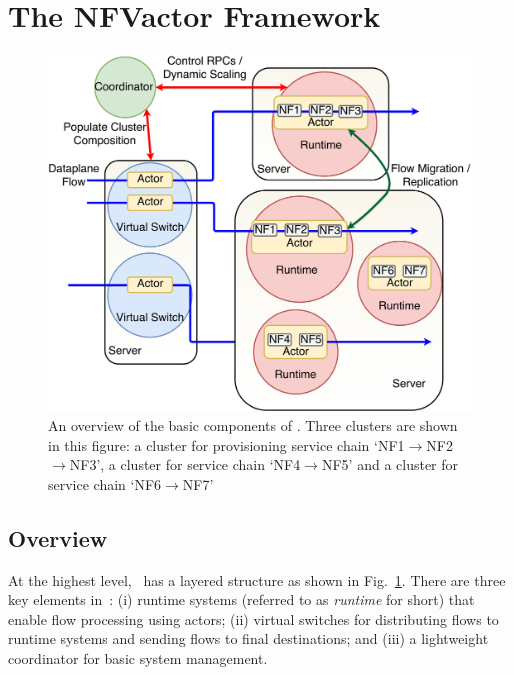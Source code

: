 
\section {The NFVactor Framework}
\label{sec:nfvactor-runtime-and-controller}

\begin{figure}[!t]
  \centering
  \includegraphics[width=\columnwidth]{chap-nfvactor/figure/new-nfactor-cluster.pdf}
  \caption{An overview of the basic components of \nfactor. Three clusters are shown in this figure: a cluster for provisioning service chain `NF1$\rightarrow$NF2$\rightarrow$NF3', a cluster for service chain `NF4$\rightarrow$NF5' and a cluster for service chain `NF6$\rightarrow$NF7'}
  \label{fig:runtime}
\end{figure}

\subsection{Overview}
\label{sec:overview}

At the highest level, \nfactor~has a layered structure as shown in Fig.~\ref{fig:runtime}. There are three key elements in~\nfactor: (i) runtime systems (referred to as \textit{runtime} for short) that enable flow processing using actors; (ii) virtual switches for distributing flows to runtime systems and sending flows to final destinations; and (iii) a lightweight coordinator for basic system management.

